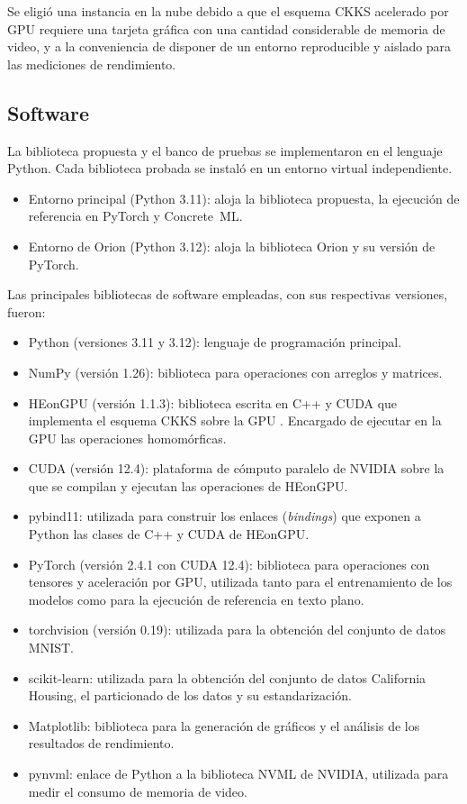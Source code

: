 Se eligió una instancia en la nube debido a que el esquema CKKS acelerado por GPU requiere una tarjeta gráfica con una cantidad considerable de memoria de video, y a la conveniencia de disponer de un entorno reproducible y aislado para las mediciones de rendimiento.

\subsection{Software}

La biblioteca propuesta y el banco de pruebas se implementaron en el lenguaje Python. Cada biblioteca probada se instaló en un entorno virtual independiente. 

\begin{itemize}
    \item Entorno principal (Python 3.11): aloja la biblioteca propuesta, la ejecución de referencia en PyTorch y Concrete~ML.
    \item Entorno de Orion (Python 3.12): aloja la biblioteca Orion y su versión de PyTorch.
\end{itemize}

Las principales bibliotecas de software empleadas, con sus respectivas versiones, fueron:

\begin{itemize}
    \item Python (versiones 3.11 y 3.12): lenguaje de programación principal.
    \item NumPy (versión 1.26): biblioteca para operaciones con arreglos y matrices.
    \item HEonGPU (versión 1.1.3): biblioteca escrita en C++ y CUDA que implementa el esquema CKKS sobre la GPU \cite{HEonGPU}. Encargado de ejecutar en la GPU las operaciones homomórficas.
    \item CUDA (versión 12.4): plataforma de cómputo paralelo de NVIDIA sobre la que se compilan y ejecutan las operaciones de HEonGPU.
    \item pybind11: utilizada para construir los enlaces (\textit{bindings}) que exponen a Python las clases de C++ y CUDA de HEonGPU.
    \item PyTorch (versión 2.4.1 con CUDA 12.4): biblioteca para operaciones con tensores y aceleración por GPU, utilizada tanto para el entrenamiento de los modelos como para la ejecución de referencia en texto plano.
    \item torchvision (versión 0.19): utilizada para la obtención del conjunto de datos MNIST.
    \item scikit-learn: utilizada para la obtención del conjunto de datos California Housing, el particionado de los datos y su estandarización.
    \item Matplotlib: biblioteca para la generación de gráficos y el análisis de los resultados de rendimiento.
    \item pynvml: enlace de Python a la biblioteca NVML de NVIDIA, utilizada para medir el consumo de memoria de video.
\end{itemize}

